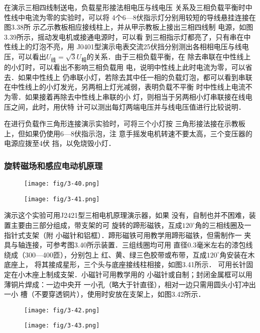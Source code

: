 在演示三相四线制送电，负载星形接法相电压与线电压
关系及三相负载平衡时中性线中电流为零的实验时，可以将
4个6—8伏指示灯分别用较短的导线悬挂连接在图3.38所
示乙示教板相应接线柱上，并从甲示教板上接出三相四线制
电源，如图3.39所示，摇动发电机或接通电源时，可以看
到三相指示灯都亮了，只有串在中性线上的灯泡不亮，用
J0401型演示电表交流25伏挡分别测出各相相电压与线电
压，可以看出$U_{\text{线}}=\sqrt{3}U_{\text{相}}$的关系．由于三相负载平衡，在
除去串联在中性线上的小灯时，可以看出不影响三相负载用
电，说明中性线上此时电流为零，可以省去．如果中性线上
仍串联小灯，若除去其中任一相的负载灯泡，都可以看到串联
在中性线上的小灯发光，另两相上灯光减弱，表明负载不平衡
时中性线上电流不为零．如果接着再除去中性线上串联的小
灯，则相当于另两相小灯串联接在线电压之间，此时，用伏特
计可以测出每灯两端电压并与线电压值进行比较说明．

在进行负载作三角形连接演示实验时，可将三个小灯按
三角形接法接在示教板上，但如果仍使用6—8伏指示泡，注
意手摇发电机转速不要太高，三个变压器的电源应拨至4伏
挡，以免烧毁小灯．

\subsubsection{旋转磁场和感应电动机原理}

\begin{figure}[htp]\centering
    \begin{minipage}[t]{0.48\textwidth}
    \centering
\texttt{[image: fig/3-40.png]}
    \caption{}
    \end{minipage}
    \begin{minipage}[t]{0.48\textwidth}
    \centering
\texttt{[image: fig/3-41.png]}
    \caption{}
    \end{minipage}
    \end{figure}

演示这个实验可用J2421型三相电机原理演示器，如果
没有，自制也并不困难，装置主要由三部分组成，带支架的可
旋转的蹄形磁铁，互成$120^{\circ}$角的三相线圈及一指针式支架（附
小磁针和铝框）．蹄形磁铁可用教学用蹄形磁铁，但需制作一
夹具与轴连接，可参考图3.40所示装置．三组线圈均可用
直径0.3毫米左右的漆包线绕成（300—400匝），分别包上
红、黄、绿三色胶带或布带，互成$120^{\circ}$角安装在木底座上，
将其接成星形，三个头与底座接线柱相接，如图3.41所示．
可用长针固定在小木座上制成支架．小磁针可用教学用的
小磁针或自制；封闭金属框可以用薄铜片焊成：一边中央开
一小孔（略大于针直径），相对一边只需用圆头小钉冲出一小
槽（不要穿透铜片），使用时安放在支架上，如图3.42所示．

\begin{figure}[htp]\centering
    \begin{minipage}[t]{0.48\textwidth}
    \centering
\texttt{[image: fig/3-42.png]}
    \caption{}
    \end{minipage}
    \begin{minipage}[t]{0.48\textwidth}
    \centering
\texttt{[image: fig/3-43.png]}
    \caption{}
    \end{minipage}
    \end{figure}

